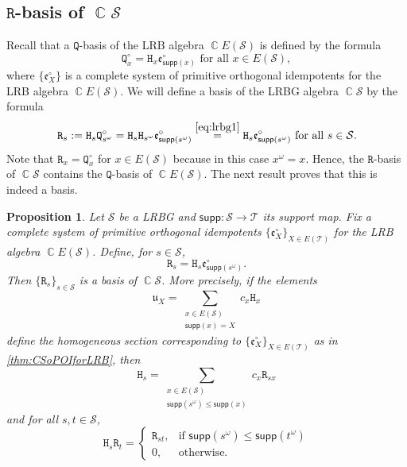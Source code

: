 \documentclass[11pt, oneside, reqno]{amsart}
\newtheorem{prop}[theorem]{Proposition}
\theoremstyle{definition}
\numberwithin{equation}{section}
\DeclareMathOperator{\C}{\mathbb{C}}
\def \SS{{\mathcal{S}}}
\def \TT{{\mathcal{T}}}
\def \kk{\C}
\def \uu{{\mathfrak{u}}}
\def \ee{{\mathfrak{e}}}
\def \supp{\mathsf{supp}}
\newcommand{\B}[1]{\mathtt{#1}} 			%
\begin{document}
\subsection{$\B{R}$-basis of $\kk \SS$}

Recall that a $\B{Q}$-basis of the LRB algebra $\kk E(\SS)$ is defined by the formula
\begin{equation*}
    \B{Q}^\circ_x = \B{H}_x \ee^\circ_{\supp(x)}
    \text{~for all~} x \in E(\SS),
\end{equation*}
where $\{\ee^\circ_{X}\}$ is a complete system of primitive orthogonal idempotents
for the LRB algebra $\kk E(\SS)$.
We will define a basis of the LRBG algebra $\kk \SS$ by the formula
\begin{equation*}
    \B{R}_s := \B{H}_{s} \B{Q}^\circ_{s^\omega}
    = \B{H}_{s} \B{H}_{s^\omega} \ee^\circ_{\supp(s^\omega)}
    \overset{\cref{eq:lrbg1}}{=}
    \B{H}_s \ee^\circ_{\supp(s^\omega)}
    \text{~for all~} s \in \SS.
\end{equation*}
Note that $\B{R}_x = \B{Q}^\circ_x$ for $x \in E(\SS)$ because in this case $x^\omega = x$.
Hence, the $\B{R}$-basis of $\kk \SS$ contains the $\B{Q}$-basis of $\kk E(\SS)$.
The next result proves that this is indeed a basis.

\begin{prop}
    \label{prop:LRBG-R-basis}
    Let $\SS$ be a LRBG and $\supp: \SS \to \TT$ its support map.
    Fix a complete system of primitive orthogonal idempotents
    $\{\ee^\circ_{X}\}_{X \in E(\TT)}$ for the LRB algebra $\kk E(\SS)$.
    Define, for $s \in \SS$,
    \begin{equation}
        \label{eq:LRBG-R-basis}
        \B{R}_s = \B{H}_s \ee^\circ_{\supp(s^\omega)}.
    \end{equation}
    Then $\{\B{R}_s\}_{s \in \SS}$ is a basis of $\kk \SS$.
    More precisely, if the elements
    \begin{equation}
        \label{eq:u-homogeneous-section}
        \uu_{X} = \sum_{\substack{x \in E(\SS) \\ \supp(x) = X}} c_x \B{H}_{x}
    \end{equation}
    define the homogeneous section corresponding to
    $\{\ee^\circ_{X}\}_{X \in E(\TT)}$ as in \cref{thm:CSoPOIforLRB},
    then
    \begin{equation}
        \label{LRBG-H-basis-to-R-basis}
        \B{H}_{s} = \sum_{\substack{x \in E(\SS) \\ \supp(s^\omega) \leq \supp(x)}} c_{x} \B{R}_{sx}
    \end{equation}
    and for all $s, t \in \SS$,
    \begin{equation}
        \label{LRBG-HR-product-formula}
        \B{H}_{s} \B{R}_{t} =
        \begin{cases}
            \B{R}_{st}, & \text{if~} \supp(s^\omega) \leq \supp(t^\omega) \\
            0,          & \text{otherwise.}
        \end{cases}
    \end{equation}
\end{prop}
\end{document}
